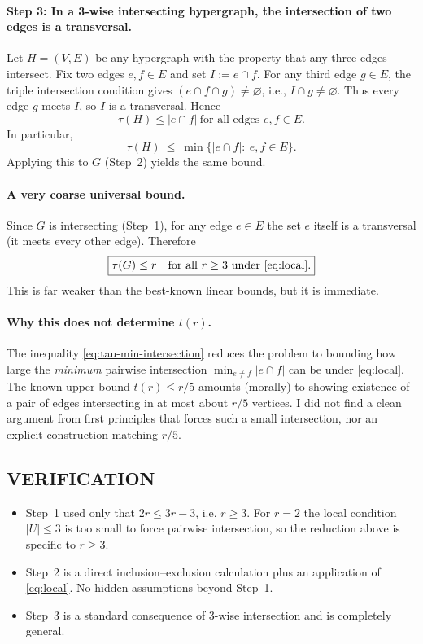 \paragraph{Step 3: In a 3-wise intersecting hypergraph, the intersection of two edges is a transversal.}
Let $H=(V,E)$ be any hypergraph with the property that any three edges intersect.
Fix two edges $e,f\in E$ and set $I:=e\cap f$.
For any third edge $g\in E$, the triple intersection condition gives $(e\cap f\cap g)\neq\varnothing$, i.e., $I\cap g\neq\varnothing$.
Thus every edge $g$ meets $I$, so $I$ is a transversal. Hence
\[
\boxed{\tau(H)\le |e\cap f|\ \text{for all edges $e,f\in E$.}}
\]
In particular,
\begin{equation}
\label{eq:tau-min-intersection}
\tau(H)\ \le\ \min\bigl\{|e\cap f|:\ e,f\in E\bigr\}.
\end{equation}
Applying this to $G$ (Step~2) yields the same bound.

\paragraph{A very coarse universal bound.}
Since $G$ is intersecting (Step~1), for any edge $e\in E$ the set $e$ itself is a transversal (it meets every other edge). Therefore
\[
\boxed{\tau(G)\le r\quad\text{for all $r\ge 3$ under \eqref{eq:local}.}}
\]
This is far weaker than the best-known linear bounds, but it is immediate.

\paragraph{Why this does not determine $t(r)$.}
The inequality \eqref{eq:tau-min-intersection} reduces the problem to bounding how large the \emph{minimum} pairwise intersection $\min_{e\ne f}|e\cap f|$ can be under \eqref{eq:local}. The known upper bound $t(r)\le r/5$ amounts (morally) to showing existence of a pair of edges intersecting in at most about $r/5$ vertices.
I did not find a clean argument from first principles that forces such a small intersection, nor an explicit construction matching $r/5$.

\subsection*{VERIFICATION}

\begin{itemize}[leftmargin=2.2em]
\item Step~1 used only that $2r\le 3r-3$, i.e. $r\ge 3$. For $r=2$ the local condition $|U|\le 3$ is too small to force pairwise intersection, so the reduction above is specific to $r\ge 3$.
\item Step~2 is a direct inclusion--exclusion calculation plus an application of \eqref{eq:local}. No hidden assumptions beyond Step~1.
\item Step~3 is a standard consequence of 3-wise intersection and is completely general.
\end{itemize}

